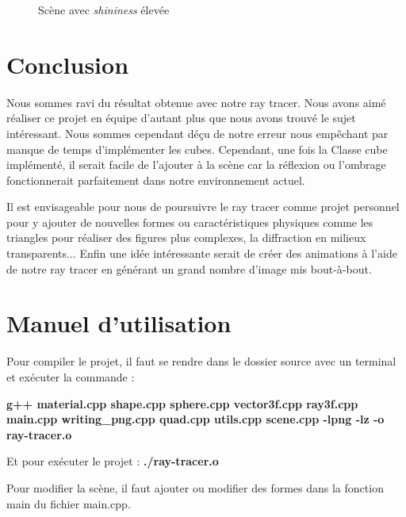 \documentclass[11pt, oneside]{article}   	%
\begin{document}
\begin{figure}[!tbp]
\begin{minipage}[b]{0.4\textwidth}
    \caption{Scène avec \textit{shininess} élevée}
  \end{minipage}
\end{figure}

\section{Conclusion}
Nous sommes ravi du résultat obtenue avec notre ray tracer. Nous avons aimé réaliser ce projet en équipe d'autant plus que nous avons trouvé le sujet intéressant. Nous sommes cependant déçu de notre erreur nous empêchant par manque de temps d'implémenter les cubes. Cependant, une fois la Classe cube implémenté, il serait facile de l'ajouter à la scène car la réflexion ou l'ombrage fonctionnerait parfaitement dans notre environnement actuel.

Il est envisageable pour nous de poursuivre le ray tracer comme projet personnel pour y ajouter de nouvelles formes ou caractéristiques physiques comme les triangles pour réaliser des figures plus complexes, la diffraction en milieux transparents... Enfin une idée intéressante serait de créer des animations à l'aide de notre ray tracer en générant un grand nombre d'image mis bout-à-bout.

\section{Manuel d'utilisation}

Pour compiler le projet, il faut se rendre dans le dossier source avec un terminal et exécuter la commande :

\textbf{g++ material.cpp shape.cpp sphere.cpp vector3f.cpp ray3f.cpp main.cpp writing\_png.cpp quad.cpp utils.cpp scene.cpp -lpng -lz -o ray-tracer.o}

Et pour exécuter le projet : \textbf{./ray-tracer.o}

Pour modifier la scène, il faut ajouter ou modifier des formes dans la fonction main du fichier main.cpp.
\end{document}
